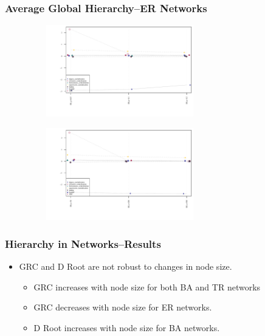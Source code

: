 \documentclass{beamer}
\newenvironment{changemargin}[2]{%
	\begin{list}{}{%
			\setlength{\topsep}{0pt}%
			\setlength{\leftmargin}{#1}%
			\setlength{\rightmargin}{#2}%
			\setlength{\listparindent}{\parindent}%
			\setlength{\itemindent}{\parindent}%
			\setlength{\parsep}{\parskip}%
		}%
		\item[]}{\end{list}}
\begin{document}
\begin{frame}\frametitle{Average Global Hierarchy--ER Networks}
	\begin{changemargin}{-2cm}{ -2cm}
		\centering
		\par
		\includegraphics[width=10cm, height=4cm]{images/ER_Param_Averages.pdf}
		\\
		\vspace{-5mm}
		\par
		\includegraphics[width=10cm, height=4cm]{images/ER_Size_Averages.pdf}
	\end{changemargin}
\end{frame}

\begin{frame}\frametitle{Hierarchy in Networks--Results}
	\begin{itemize}
		\item GRC and D Root are not robust to changes in node size.
		\begin{itemize}
			\item GRC increases with node size for both BA and TR networks
			\item GRC decreases with node size for ER networks. 
			\item D Root increases with node size for BA networks.
		\end{itemize}
	\end{itemize}
\end{frame}
\end{document}
